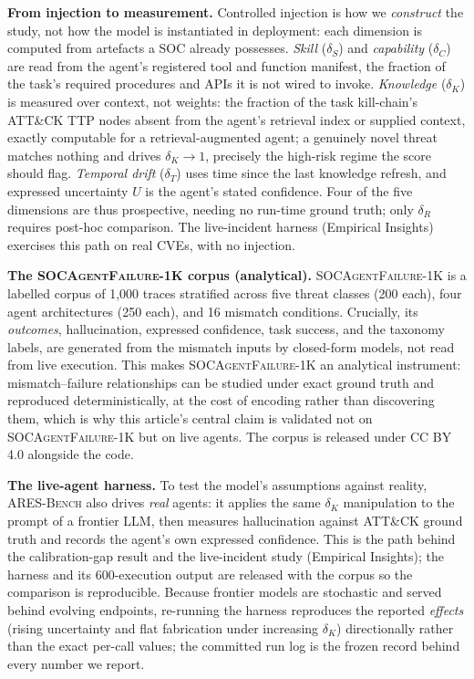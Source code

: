 \documentclass[journal,compsoc]{IEEEtran}
\newcommand{\ARESBench}{\textsc{ARES-Bench}}
\newcommand{\SAFK}{\textsc{SOCAgentFailure-1K}}
\begin{document}
\textbf{From injection to measurement.} Controlled injection is how we
\textit{construct} the study, not how the model is instantiated in
deployment: each dimension is computed from artefacts a SOC already
possesses. \textit{Skill} ($\delta_S$) and \textit{capability}
($\delta_C$) are read from the agent's registered tool and function
manifest, the fraction of the task's required procedures and APIs it is
not wired to invoke. \textit{Knowledge} ($\delta_K$) is measured over
context, not weights: the fraction of the task kill-chain's ATT\&CK TTP
nodes absent from the agent's retrieval index or supplied context,
exactly computable for a retrieval-augmented agent; a genuinely novel
threat matches nothing and drives $\delta_K \to 1$, precisely the
high-risk regime the score should flag. \textit{Temporal drift}
($\delta_T$) uses time since the last knowledge refresh, and expressed
uncertainty $U$ is the agent's stated confidence. Four of the five
dimensions are thus prospective, needing no run-time ground truth; only
$\delta_R$ requires post-hoc comparison. The live-incident harness
(Empirical Insights) exercises this path on real CVEs, with no
injection.

\textbf{The \SAFK{} corpus (analytical).} \SAFK{} is a labelled corpus
of 1{,}000 traces stratified across five threat classes (200 each),
four agent architectures (250 each), and 16 mismatch conditions.
Crucially, its \textit{outcomes}, hallucination, expressed confidence,
task success, and the taxonomy labels, are generated from the mismatch
inputs by closed-form models, not read from live execution. This makes \SAFK{} an analytical instrument: mismatch--failure
relationships can be studied under exact ground truth and reproduced
deterministically, at the cost of encoding rather than discovering
them, which is why this article's central claim is validated not on
\SAFK{} but on live agents. The corpus is released under CC BY 4.0
alongside the code.

\textbf{The live-agent harness.} To test the model's assumptions
against reality, \ARESBench{} also drives \textit{real} agents: it
applies the same $\delta_K$ manipulation to the prompt of a
frontier LLM, then measures hallucination against ATT\&CK ground truth
and records the agent's own expressed confidence. This is the path
behind the calibration-gap result and the live-incident study
(Empirical Insights); the harness and its 600-execution output are
released with the corpus so the comparison is reproducible. Because
frontier models are stochastic and served behind evolving endpoints,
re-running the harness reproduces the reported \textit{effects}
(rising uncertainty and flat fabrication under increasing $\delta_K$)
directionally rather than the exact per-call values; the committed
run log is the frozen record behind every number we report.
\end{document}
